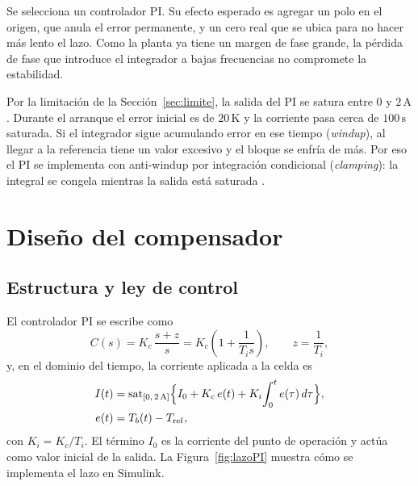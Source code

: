 \documentclass[journal,twocolumn]{IEEEtran}
\begin{document}
Se selecciona un controlador PI. Su efecto esperado es agregar un polo en el origen, que anula el error permanente, y un cero real que se ubica para no hacer más lento el lazo. Como la planta ya tiene un margen de fase grande, la pérdida de fase que introduce el integrador a bajas frecuencias no compromete la estabilidad.

Por la limitación de la Sección~\ref{sec:limite}, la salida del PI se satura entre $0$ y $2\,\mathrm A$. Durante el arranque el error inicial es de $20\,\mathrm K$ y la corriente pasa cerca de $100\,\mathrm s$ saturada. Si el integrador sigue acumulando error en ese tiempo (\emph{windup}), al llegar a la referencia tiene un valor excesivo y el bloque se enfría de más. Por eso el PI se implementa con anti-windup por integración condicional (\emph{clamping}): la integral se congela mientras la salida está saturada \cite{astrom,mw_pid}.

\section{Diseño del compensador}\label{sec:diseno}
\subsection{Estructura y ley de control}
El controlador PI se escribe como
\begin{equation}
C(s)=K_c\,\frac{s+z}{s}=K_c\left(1+\frac{1}{T_is}\right),\qquad z=\frac{1}{T_i},\label{eq:PI}
\end{equation}
y, en el dominio del tiempo, la corriente aplicada a la celda es
\begin{equation}
\begin{split}
I(t)&=\mathrm{sat}_{[0,\,2\,\mathrm A]}\Big\{I_0+K_c\,e(t)+K_i\!\int_0^t e(\tau)\,d\tau\Big\},\\
e(t)&=T_b(t)-T_{\rm ref},
\end{split}\label{eq:ley}
\end{equation}
con $K_i=K_c/T_i$. El término $I_0$ es la corriente del punto de operación y actúa como valor inicial de la salida. La Figura~\ref{fig:lazoPI} muestra cómo se implementa el lazo en Simulink.
\end{document}
